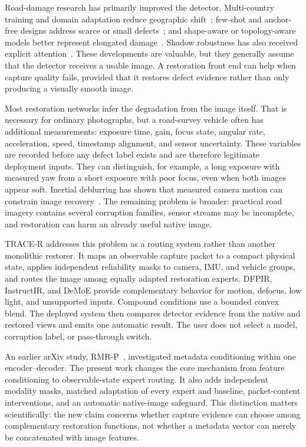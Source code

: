 \documentclass[journal]{IEEEtran}
\newcommand{\tracer}{TRACE-R\xspace}
\begin{document}
Road-damage research has primarily improved the detector. Multi-country training and domain adaptation reduce geographic shift~\cite{arya2022rdd2022,lin2023dardd}; few-shot and anchor-free designs address scarce or small defects~\cite{su2022fsrdd,li2024yoloxrdd}; and shape-aware or topology-aware models better represent elongated damage~\cite{zhang2024shapeadaptation,jing2025topologycrack}. Shadow robustness has also received explicit attention~\cite{kong2025shadowrobust}. These developments are valuable, but they generally assume that the detector receives a usable image. A restoration front end can help when capture quality fails, provided that it restores defect evidence rather than only producing a visually smooth image.

Most restoration networks infer the degradation from the image itself. That is necessary for ordinary photographs, but a road-survey vehicle often has additional measurements: exposure time, gain, focus state, angular rate, acceleration, speed, timestamp alignment, and sensor uncertainty. These variables are recorded before any defect label exists and are therefore legitimate deployment inputs. They can distinguish, for example, a long exposure with measured yaw from a short exposure with poor focus, even when both images appear soft. Inertial deblurring has shown that measured camera motion can constrain image recovery~\cite{joshi2010imu,hu2016smartphoneimu,yang2025gyro}. The remaining problem is broader: practical road imagery contains several corruption families, sensor streams may be incomplete, and restoration can harm an already useful native image.

\tracer addresses this problem as a routing system rather than another monolithic restorer. It maps an observable capture packet to a compact physical state, applies independent reliability masks to camera, IMU, and vehicle groups, and routes the image among equally adapted restoration experts. DFPIR, InstructIR, and DeMoE provide complementary behavior for motion, defocus, low light, and unsupported inputs. Compound conditions use a bounded convex blend. The deployed system then compares detector evidence from the native and restored views and emits one automatic result. The user does not select a model, corruption label, or pass-through switch.

An earlier arXiv study, RMR-P~\cite{ghorbani2026rmrp}, investigated metadata conditioning within one encoder--decoder. The present work changes the core mechanism from feature conditioning to observable-state expert routing. It also adds independent modality masks, matched adaptation of every expert and baseline, packet-content interventions, and an automatic native-image safeguard. This distinction matters scientifically: the new claim concerns whether capture evidence can choose among complementary restoration functions, not whether a metadata vector can merely be concatenated with image features.
\end{document}
